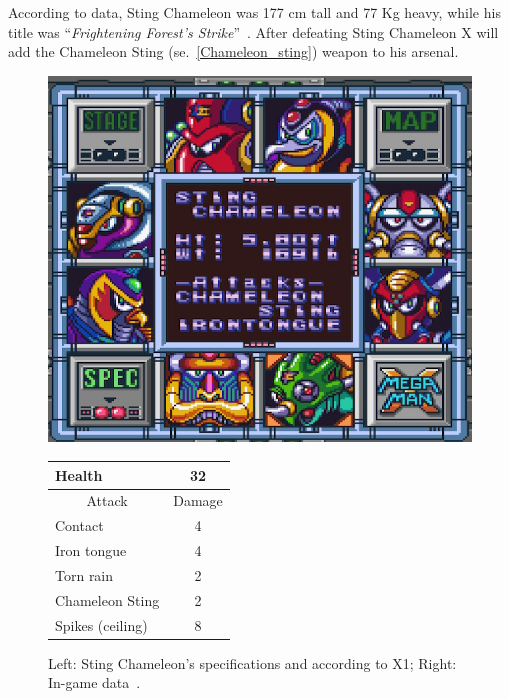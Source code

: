 According to data, Sting Chameleon was 177 cm tall and 77 Kg heavy, while his title was ``\textit{Frightening Forest's Strike}''~\cite{book:MMX_Complete_art}.
After defeating Sting Chameleon X will add the Chameleon Sting (se.~\ref{Chameleon_sting}) weapon to his arsenal.

\begin{figure}[htp]
	\begin{minipage}[c]{0.45\linewidth}
		\vspace{0pt}
		\centering
		\includegraphics[width=\linewidth]{figures/X1/Sting_chameleon/Sting_chameleon_specs.png}
	\end{minipage}
	\begin{minipage}[c]{0.45\linewidth}
		\centering
		\vspace{0pt}
		\begin{tabular}[h]{l c}
			\toprule
			Health  & 32\\
			\midrule
			\multicolumn{1}{c}{Attack} & \multicolumn{1}{c}{Damage}\\
			Contact & 4\\
			Iron tongue & 4\\
			Torn rain & 2\\
			Chameleon Sting & 2\\
			Spikes (ceiling) & 8\\
			\bottomrule
		\end{tabular}
	\end{minipage}
	\caption{Left: Sting Chameleon's specifications and according to X1; Right: In-game data~\cite{wiki:Sting_chameleon}. }
	\label{Chameleon_specs}
\end{figure}


